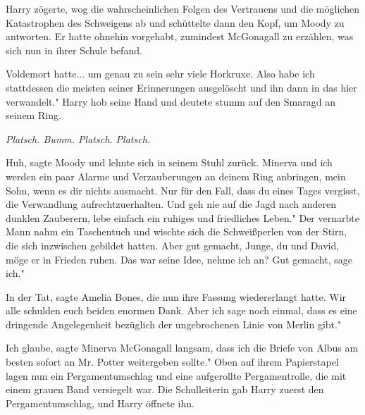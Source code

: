 Harry zögerte, wog die wahrscheinlichen Folgen des Vertrauens und die möglichen
Katastrophen des Schweigens ab und schüttelte dann den Kopf, um Moody zu
antworten. Er hatte ohnehin vorgehabt, zumindest McGonagall zu erzählen, was
sich nun in ihrer Schule befand.

\glqq{}Voldemort hatte... um genau zu sein sehr viele Horkruxe. Also habe ich
stattdessen die meisten seiner Erinnerungen ausgelöscht und ihn dann in das hier
verwandelt." Harry hob seine Hand und deutete stumm auf den Smaragd an seinem
Ring.

\emph{Platsch. Bumm. Platsch. Platsch.}

\glqq{}Huh\grqq{}, sagte Moody und lehnte sich in seinem Stuhl zurück. \glqq
Minerva und ich werden ein paar Alarme und Verzauberungen an deinem Ring
anbringen, mein Sohn, wenn es dir nichts ausmacht. Nur für den Fall, dass du
eines Tages vergisst, die Verwandlung aufrechtzuerhalten. Und geh nie auf die
Jagd nach anderen dunklen Zauberern, lebe einfach ein ruhiges und friedliches
Leben." Der vernarbte Mann nahm ein Taschentuch und wischte sich die
Schweißperlen von der Stirn, die sich inzwischen gebildet hatten. \glqq{}Aber gut
gemacht, Junge, du und David, möge er in Frieden ruhen. Das war seine Idee,
nehme ich an? Gut gemacht, sage ich."

\glqq{}In der Tat\grqq{}, sagte Amelia Bones, die nun ihre Fassung wiedererlangt
hatte. \glqq{}Wir alle schulden euch beiden enormen Dank. Aber ich sage noch
einmal, dass es eine dringende Angelegenheit bezüglich der ungebrochenen Linie
von Merlin gibt."

\glqq{}Ich glaube\grqq{}, sagte Minerva McGonagall langsam, \glqq{}dass ich die
Briefe von Albus am besten sofort an Mr. Potter weitergeben sollte." Oben auf
ihrem Papierstapel lagen nun ein Pergamentumschlag und eine aufgerollte
Pergamentrolle, die mit einem grauen Band versiegelt war. Die Schulleiterin gab
Harry zuerst den Pergamentumschlag, und Harry öffnete ihn.

